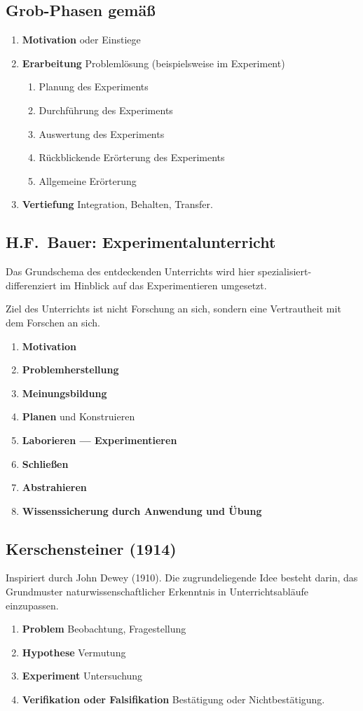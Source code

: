 \subsection{Grob-Phasen gem\"{a}{\ss} \textcite{DuitHausslerKircher}}
\begin{enumerate}
	\item {\bf Motivation} oder Einstiege
	\item {\bf Erarbeitung} Probleml\"{o}sung (beispielsweise im Experiment)
	\begin{enumerate}
	\item
	Planung des Experiments
	\item
	Durchf\"{u}hrung des Experiments
	\item
	Auswertung des Experiments
	\item
	R\"{u}ckblickende Er\"{o}rterung des Experiments
	\item
	Allgemeine Er\"{o}rterung
	\end{enumerate}
	\item {\bf Vertiefung} Integration, Behalten, Transfer.
\end{enumerate}
	
\subsection{H.F.\ Bauer: Experimentalunterricht}
Das Grundschema des entdeckenden Unterrichts wird
hier spezialisiert-differenziert im Hinblick auf
das Experimentieren umgesetzt.

\mip Ziel des Unterrichts ist nicht Forschung an sich, sondern eine
Vertrautheit mit dem Forschen an sich.
	\begin{enumerate}
	\item {\bf Motivation}
	\item {\bf Problemherstellung}
	\item {\bf Meinungsbildung}
	\item {\bf Planen} und Konstruieren
	\item {\bf Laborieren --- Experimentieren}
	\item {\bf Schlie{\ss}en}
	\item {\bf Abstrahieren}
	\item {\bf Wissenssicherung durch Anwendung und \"{U}bung}
\end{enumerate}

\subsection{Kerschensteiner (1914)}
Inspiriert durch John Dewey (1910).
Die zugrundeliegende Idee besteht darin, das Grundmuster
naturwissenschaftlicher Erkenntnis
in Unterrichtsabl\"{a}ufe einzupassen.
\begin{enumerate}
	\item {\bf Problem} Beobachtung, Fragestellung
	\item {\bf Hypothese} Vermutung
	\item {\bf Experiment} Untersuchung
	\item {\bf Verifikation oder Falsifikation} Best\"{a}tigung oder
	Nichtbest\"{a}tigung.
\end{enumerate}

